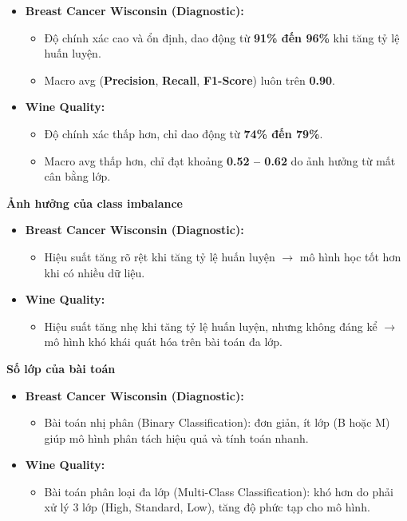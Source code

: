 \begin{itemize}
	\item \textbf{Breast Cancer Wisconsin (Diagnostic):}
	\begin{itemize}
		\item Độ chính xác cao và ổn định, dao động từ \textbf{91\% đến 96\%} khi tăng tỷ lệ huấn luyện.
		\item Macro avg (\textbf{Precision}, \textbf{Recall}, \textbf{F1-Score}) luôn trên \textbf{0.90}.
	\end{itemize}
	\item \textbf{Wine Quality:}
	\begin{itemize}
		\item Độ chính xác thấp hơn, chỉ dao động từ \textbf{74\% đến 79\%}.
		\item Macro avg thấp hơn, chỉ đạt khoảng \textbf{0.52 -- 0.62} do ảnh hưởng từ mất cân bằng lớp.
	\end{itemize}
\end{itemize}



\textbf{Ảnh hưởng của class imbalance}
\begin{itemize}
	\item \textbf{Breast Cancer Wisconsin (Diagnostic):}
	\begin{itemize}
		\item Hiệu suất tăng rõ rệt khi tăng tỷ lệ huấn luyện $\rightarrow$ mô hình học tốt hơn khi có nhiều dữ liệu.
	\end{itemize}
	\item \textbf{Wine Quality:}
	\begin{itemize}
		\item Hiệu suất tăng nhẹ khi tăng tỷ lệ huấn luyện, nhưng không đáng kể $\rightarrow$ mô hình khó khái quát hóa trên bài toán đa lớp.
	\end{itemize}
\end{itemize}

\textbf{Số lớp của bài toán}

\begin{itemize}
	\item \textbf{Breast Cancer Wisconsin (Diagnostic):}
	\begin{itemize}
		\item Bài toán nhị phân (Binary Classification): đơn giản, ít lớp (B hoặc M) giúp mô hình phân tách hiệu quả và tính toán nhanh.
	\end{itemize}
	\item \textbf{Wine Quality:}
	\begin{itemize}
		\item Bài toán phân loại đa lớp (Multi-Class Classification): khó hơn do phải xử lý 3 lớp (High, Standard, Low), tăng độ phức tạp cho mô hình.
	\end{itemize}
\end{itemize}

